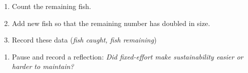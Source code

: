 \documentclass[]{tufte-handout}
\providecommand{\tightlist}{%
  \setlength{\itemsep}{0pt}\setlength{\parskip}{0pt}}
\begin{document}
\begin{enumerate}
\def\labelenumi{\alph{enumi}.}
\tightlist
\item
  Count the remaining fish.
\item
  Add new fish so that the remaining number has doubled in size.
\item
  Record these data (\emph{fish caught, fish remaining})
\end{enumerate}

\begin{enumerate}
\def\labelenumi{\arabic{enumi}.}
\setcounter{enumi}{2}
\tightlist
\item
  Pause and record a reflection: \emph{Did fixed-effort make
  sustainability easier or harder to maintain?}
\end{enumerate}
\end{document}
